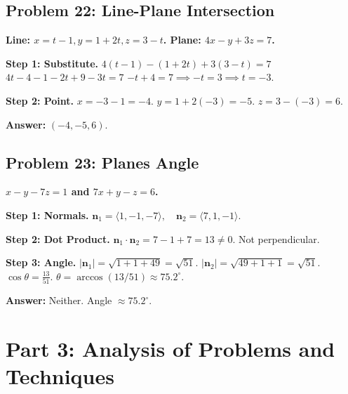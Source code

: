 \documentclass[11pt]{article}
\begin{document}
\hrulefill

\subsection*{Problem 22: Line-Plane Intersection}
\textbf{Line: $x=t-1, y=1+2t, z=3-t$. Plane: $4x-y+3z=7$.}

\textbf{Step 1: Substitute.}
$4(t-1) - (1+2t) + 3(3-t) = 7$
$4t - 4 - 1 - 2t + 9 - 3t = 7$
$-t + 4 = 7 \implies -t = 3 \implies t = -3$.

\textbf{Step 2: Point.}
$x = -3 - 1 = -4$.
$y = 1 + 2(-3) = -5$.
$z = 3 - (-3) = 6$.

\textbf{Answer:}
$(-4, -5, 6)$.

\hrulefill

\subsection*{Problem 23: Planes Angle}
\textbf{$x-y-7z=1$ and $7x+y-z=6$.}

\textbf{Step 1: Normals.}
$\mathbf{n}_1 = \langle 1, -1, -7 \rangle, \quad \mathbf{n}_2 = \langle 7, 1, -1 \rangle$.

\textbf{Step 2: Dot Product.}
$\mathbf{n}_1 \cdot \mathbf{n}_2 = 7 - 1 + 7 = 13 \neq 0$. Not perpendicular.

\textbf{Step 3: Angle.}
$|\mathbf{n}_1| = \sqrt{1+1+49} = \sqrt{51}$.
$|\mathbf{n}_2| = \sqrt{49+1+1} = \sqrt{51}$.
$\cos \theta = \frac{13}{51}$.
$\theta = \arccos(13/51) \approx 75.2^{\circ}$.

\textbf{Answer:}
Neither. Angle $\approx 75.2^{\circ}$.

\newpage

\section{Part 3: Analysis of Problems and Techniques}
\end{document}

